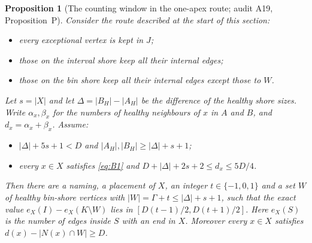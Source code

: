 \documentclass[11pt]{article}
\newtheorem{proposition}[theorem]{Proposition}
\theoremstyle{definition}
\begin{document}
\begin{proposition}[The counting window in the one-apex route; audit A19, Proposition~P]\label{prop:bal-app}
Consider the route described at the start of this section:
\begin{itemize}[nosep]
\item every exceptional vertex is kept in $J$;
\item those on the interval shore keep all their internal edges;
\item those on the bin shore keep all their internal edges except those to $W$.
\end{itemize}
Let $s=|X|$ and let $\Delta=|B_H|-|A_H|$ be the difference of the healthy shore sizes. Write $\alpha_x,\beta_x$ for the numbers of \emph{healthy} neighbours of $x$ in $A$ and $B$, and $d_x=\alpha_x+\beta_x$. Assume:
\begin{itemize}[nosep]
\item $|\Delta|+5s+1<D$ and $|A_H|,|B_H|\ge|\Delta|+s+1$;
\item every $x\in X$ satisfies \eqref{eq:B1} and $D+|\Delta|+2s+2\le d_x\le5D/4$.
\end{itemize}
Then there are a naming, a placement of $X$, an integer $t\in\{-1,0,1\}$ and a set $W$ of healthy bin-shore vertices with $|W|=\Gamma+t\le|\Delta|+s+1$, such that the \emph{exact} value $e_X(I)-e_X(K\setminus W)$ lies in $[D(t-1)/2,D(t+1)/2]$. Here $e_X(S)$ is the number of edges inside $S$ with an end in $X$. Moreover every $x\in X$ satisfies $d(x)-|N(x)\cap W|\ge D$.
\end{proposition}
\end{document}
